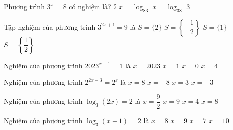 \begin{ex}%
	Phương trình $3^x=8$  có nghiệm là?
	 \choice
		{$2$} 
		{$x=\log_83$} 
		{\True  $x=\log_38$}
		{$3$} 
\end{ex}

\begin{ex}%
	Tập  nghiệm của phương trình $3^{2 x+1}=9$ là
	\choice 
		 {$S=\{2\}$}
		 {$S=\left\{-\dfrac{1}{2}\right\}$}
		{$S=\{1\}$} 
		 {\True $S=\left\{\dfrac{1}{2}\right\}$}
\end{ex}

\begin{ex}%
	Nghiệm của phương trình  $2023^{x-1}=1$ là
	\choice 
		 {$x=2023$}
		{\True  $x=1$}
		{$x=0$} 
		 {$x=4$}
\end{ex}

\begin{ex}%
	Nghiệm của phương trình $2^{2x-3}=2^x$  là
	\choice 
		{$x=8$} 
		{$x=-8$} 
		 {\True $x=3$}
		{$x=-3$} 
\end{ex}

\begin{ex}%
	Nghiệm của phương  trình $\log_{3}{\left(2x \right)} = 2$ là
	\choice 
		 {\True $x = \dfrac{9}{2}$}
		{$x  = 9$}
		{$x = 4$} 
		{$x  = 8$}
\end{ex}

\begin{ex}%
	Nghiệm của phương trình $\log_3  \left(x-1\right)=2$ là
	 \choice
		 {$x=8$}
		 {$x=9$}
		{$x=7$} 
		{\True $x=10$} 
\end{ex}

